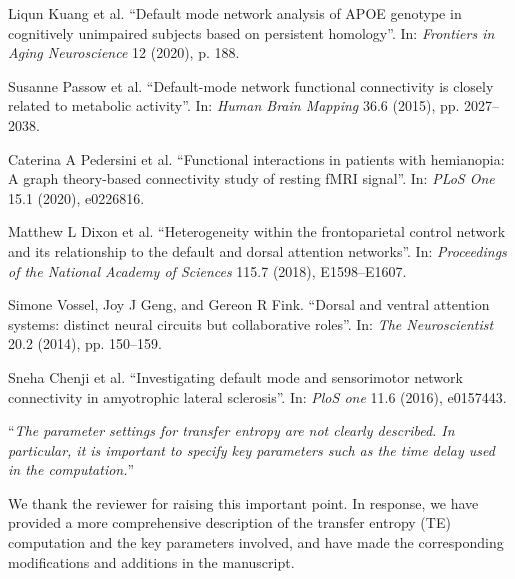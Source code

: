 \documentclass[12pt,technote,onecolumn]{IEEEtran}
\begin{document}
\noindent[*7]\:Liqun Kuang et al. ``Default mode network analysis
of APOE genotype in cognitively unimpaired subjects
based on persistent homology”. In: \textit{Frontiers in Aging
Neuroscience} 12 (2020), p. 188.


\noindent[*8]\:Susanne Passow et al. ``Default-mode network functional
connectivity is closely related to metabolic activity”.
In: \textit{Human Brain Mapping} 36.6 (2015), pp. 2027–
2038.


\noindent[*9]\:Caterina A Pedersini et al. ``Functional interactions in
patients with hemianopia: A graph theory-based connectivity
study of resting fMRI signal”. In: \textit{PLoS One}
15.1 (2020), e0226816.

\noindent[*10]\:Matthew L Dixon et al. ``Heterogeneity within the
frontoparietal control network and its relationship to the
default and dorsal attention networks”. In: \textit{Proceedings
of the National Academy of Sciences} 115.7 (2018),
E1598–E1607.

\noindent[*11]\:Simone Vossel, Joy J Geng, and Gereon R Fink. ``Dorsal
and ventral attention systems: distinct neural circuits but
collaborative roles”. In: \textit{The Neuroscientist} 20.2 (2014),
pp. 150–159.

\noindent[*12]\:Sneha Chenji et al. ``Investigating default mode and sensorimotor
network connectivity in amyotrophic lateral
sclerosis”. In: \textit{PloS one} 11.6 (2016), e0157443.



\newpage

\vspace{4mm}

 ``{\it The parameter settings for transfer entropy are not clearly described. In particular, it is important to specify key parameters such as the time delay used in the computation.}''
\vspace{1mm}


We thank the reviewer for raising this important point. In response, we have provided a more comprehensive description of the transfer entropy (TE) computation and the key parameters involved, and have made the corresponding modifications and additions in the manuscript.
\end{document}
